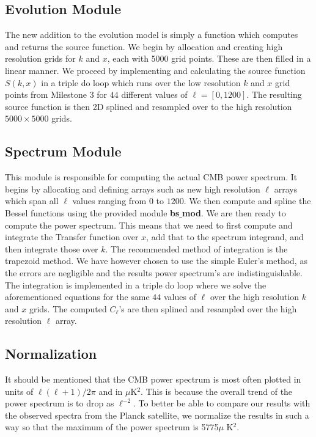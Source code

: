 \documentclass[a4paper, 10pt, reqno]{amsart}
\begin{document}
\subsection{Evolution Module} The new addition to the evolution model is simply a function which computes and returns the source function.
We begin by allocation and creating high resolution grids for $k$ and $x$, each with 5000 grid points. These are then filled in a linear manner. We proceed by implementing and calculating the source function $S(k,x)$ in a triple do loop which runs over the low resolution $k$ and $x$ grid points from Milestone 3 for $44$ different values of $\ell = [0,1200]$. The resulting source function is then 2D splined and resampled over to the high resolution $5000 \times 5000$ grids.
\subsection{Spectrum Module} This module is responsible for computing the actual CMB power spectrum. It begins by allocating and defining arrays such as new high resolution $\ell$ arrays which span all $\ell$ values ranging from $0$ to $1200$. We then compute and spline the Bessel functions using the provided module \textbf{bs$\_$mod}. We are then ready to compute the power spectrum. This means that we need to first compute and integrate the Transfer function over $x$, add that to the spectrum integrand, and then integrate those over $k$. The recommended method of integration is the trapezoid method. We have however chosen to use the simple Euler's method, as the errors are negligible and the results power spectrum's are indistinguishable.  The integration is implemented in a triple do loop where we solve the aforementioned equations for the same $44$ values of $\ell$ over the high resolution $k$ and $x$ grids. The computed $C_\ell$'s are then splined and resampled over the high resolution $\ell$ array.

\subsection{Normalization}
It should be mentioned that the CMB power spectrum is most often plotted in units of $\ell(\ell+1)/2\pi$ and in $\mu$K$^2$. This is because the overall trend of the power spectrum is to drop as $\ell^{-2}$. To better be able to compare our results with the observed spectra from the Planck satellite, we normalize the results in such a way so that the maximum of the power spectrum is 5775$\mu$ K$^2$.
\end{document}
